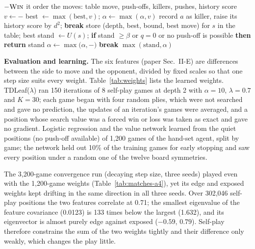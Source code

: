 \documentclass[a4paper,10pt]{article}
\begin{document}
\begin{algorithm}[!htbp]
\caption{The final agent's negamax alpha--beta search with its enhancements}\label{alg:ab}
\begin{algorithmic}[1]
   \Return $-\textsc{Win}$ \EndIf
   \Return {} \EndIf
   \Return it \EndIf
  \State order the moves: table move, push-offs, killers, pushes, history score
    \State $v \gets -$
    \State best $\gets \max(\text{best}, v)$; $\alpha \gets \max(\alpha, v)$
    \If{$\alpha \ge \beta$} record $a$ as killer, raise its history score by $d^2$; \textbf{break} \EndIf
  \EndFor
  \State store (depth, best, bound, best move) for $s$ in the table; \Return best
\EndFunction
{}
  \State stand $\gets U(s)$; \textbf{if} stand $\ge \beta$ or $q = 0$ or no push-off is possible \textbf{then return} stand
    \State $\alpha \gets \max(\alpha, -$$)$
    \If{$\alpha \ge \beta$} \textbf{break} \EndIf
  \EndFor
  \State \Return $\max(\text{stand}, \alpha)$
\EndFunction
\end{algorithmic}
\end{algorithm}

\textbf{Evaluation and learning.} The six features (paper Sec.~II-E) are differences between the side to move and the
opponent, divided by fixed scales so that one step size suits every weight. Table~\ref{tab:weights} lists the
learned weights. TDLeaf($\lambda$) ran 150 iterations of 8 self-play games at depth 2 with $\alpha=10$,
$\lambda=0.7$ and $K=30$; each game began with four random plies, which were not searched and gave no prediction,
the updates of an iteration's games were averaged, and a position whose search value was a forced win or loss was
taken as exact and gave no gradient. Logistic regression and the
value network learned from the quiet positions (no push-off available) of 1,200 games of the hand-set agent, split
by game; the network held out 10\% of the training games for early stopping and saw every position under a random
one of the twelve board symmetries.

The 3,200-game convergence run (decaying step size, three seeds) played even with the 1,200-game weights
(Table~\ref{tab:matches-a4}), yet its edge and exposed weights kept drifting in the same direction in all three
seeds. Over 302,046 self-play positions the two features correlate at 0.71; the smallest eigenvalue of the feature
covariance (0.0123) is 133 times below the largest (1.632), and its eigenvector is almost purely edge against
exposed ($-0.59$, $0.79$). Self-play therefore constrains the sum of the two weights tightly and their difference
only weakly, which changes the play little.
\end{document}
